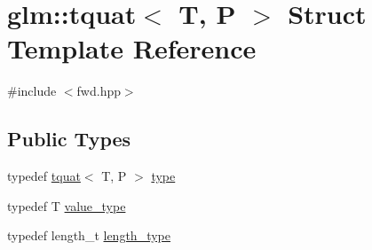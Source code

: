 \hypertarget{structglm_1_1tquat}{}\section{glm\+:\+:tquat$<$ T, P $>$ Struct Template Reference}
\label{structglm_1_1tquat}


{\ttfamily \#include $<$fwd.\+hpp$>$}

\subsection*{Public Types}
\begin{DoxyCompactItemize}
\item 
typedef \hyperlink{structglm_1_1tquat}{tquat}$<$ T, P $>$ \hyperlink{structglm_1_1tquat_a5a7bf29e6af38b1b79e9f553fd85f3ec}{type}
\item 
typedef T \hyperlink{structglm_1_1tquat_ab335d431872cb11fb3b5e2476adc32d8}{value\+\_\+type}
\item 
typedef length\+\_\+t \hyperlink{structglm_1_1tquat_ab3ef67a20d129dcb01f042042218ba17}{length\+\_\+type}
\end{DoxyCompactItemize}
